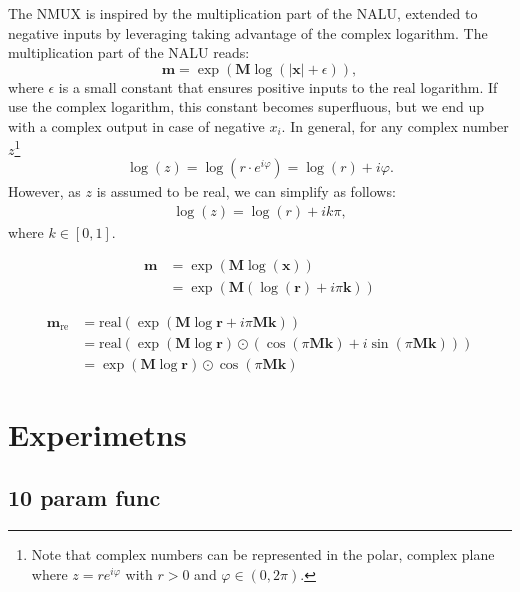 \documentclass[9pt]{article}
\newcommand{\real}{\text{real}}
\begin{document}
The NMUX is inspired by the multiplication part of the NALU, extended to
negative inputs by leveraging taking advantage of the complex logarithm.
The multiplication part of the NALU reads:
\begin{equation}
  \bm m = \exp(\bm M \log(|\bm x| + \epsilon)),
\end{equation}
where $\epsilon$ is a small constant that ensures positive inputs to the real
logarithm.  If use the complex logarithm, this constant becomes superfluous,
but we end up with a complex output in case of negative $x_i$.  In general, for
any complex number $z$\footnote{Note that complex numbers can be represented in
the polar, complex plane where $z=re^{i\varphi}$ with $r>0$ and $\varphi \in
(0,2\pi)$.}
\begin{align}
  \log(z) = \log\left(r\cdot e^{i\varphi}\right)
     = \log(r) + i\varphi.
\end{align}
However, as $z$ is assumed to be real, we can simplify as follows:
\begin{align}
  \log(z) = \log(r) + ik\pi,
\end{align}
where $k \in [0,1]$.

\begin{align}
  \bm m &= \exp(\bm M \log(\bm x)) \\
    &= \exp(\bm M ( \log(\bm r) + i\pi\bm k ))
\end{align}

\begin{align}
  \bm m_{\text{re}} &= \real(\exp(\bm M \log \bm r + i\pi\bm M\bm k)) \\
    &= \real(\exp(\bm M \log \bm r) \odot (\cos(\pi \bm M \bm k) + i \sin(\pi \bm M \bm k))) \\
    &= \exp(\bm M \log \bm r) \odot \cos(\pi \bm M \bm k)
\end{align}

\section{Experimetns}%
\label{sec:experimetns}

\subsection{10 param func}%
\label{sub:10_param_func}
\end{document}
